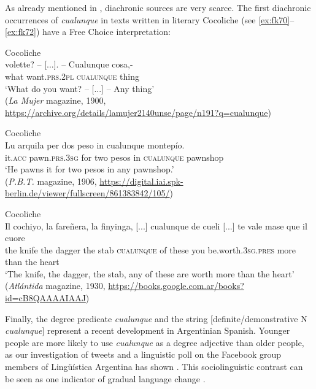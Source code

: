 \documentclass[output=paper,colorlinks,citecolor=brown]{langscibook}
\begin{document}
As already mentioned in  , diachronic sources are very scarce. The first diachronic occurrences of \textit{cualunque} in texts written in literary Cocoliche (see \ref{ex:fk70}--\ref{ex:fk72}) have a Free Choice interpretation:

\ea \label{ex:fk70}
    Cocoliche\\
     volette? {-- [...]. --} Cualunque cosa,-\\
    what want.\textsc{prs.2pl} {} \textsc{cualunque} thing\\
    \glt ‘What do you want? -- [...] -- Any thing’\\
    (\textit{La Mujer} magazine, 1900, \url{https://archive.org/details/lamujer2140unse/page/n191?q=cualunque})
    
    \ex \label{ex:fk71}
    Cocoliche\\
    \gll Lu arquila per dos peso in cualunque montepío.\\
    it.\textsc{acc} pawn.\textsc{prs.3sg} for two pesos in \textsc{cualunque} pawnshop\\
    \glt ‘He pawns it for two pesos in any pawnshop.’\\
    (\textit{P.B.T.} magazine, 1906, \url{https://digital.iai.spk-berlin.de/viewer/fullscreen/861383842/105/})
    
    \ex \label{ex:fk72}
    Cocoliche\\
    \gll Il cochiyo, la fareñera, la finyinga, [...] cualunque de cueli [...] te vale mase que il cuore\\
    the knife the dagger the stab {} \textsc{cualunque} of these {} you be.worth.\textsc{3sg.pres} more than the heart\\
    \glt ‘The knife, the dagger, the stab, any of these are worth more than the heart’\\
    (\textit{Atlántida} magazine, 1930, \url{https://books.google.com.ar/books?id=cB8QAAAAIAAJ})
\z

Finally, the degree predicate \textit{cualunque} and the string [definite/demonstrative N \textit{cualunque}] represent a recent development in Argentinian Spanish. Younger people are more likely to use \textit{cualunque} as a degree adjective than older people, as our investigation of tweets and a linguistic poll on the Facebook group members of Lingüística Argentina has shown \citep{Kellert2021c}. This sociolinguistic contrast can be seen as one indicator of gradual language change \citep[see][]{Stein1990, SeilerEnkeMühlenbernd2018}.
\end{document}
